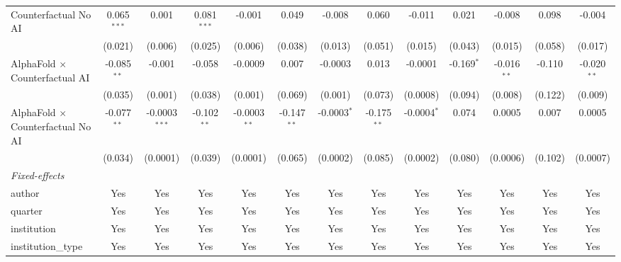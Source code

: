 \begin{tabular}{lcccccccccccc}
   Counterfactual No AI                     & 0.065$^{***}$ & 0.001           & 0.081$^{***}$ & -0.001         & 0.049         & -0.008        & 0.060         & -0.011        & 0.021         & -0.008        & 0.098        & -0.004\\   
                                            & (0.021)       & (0.006)         & (0.025)       & (0.006)        & (0.038)       & (0.013)       & (0.051)       & (0.015)       & (0.043)       & (0.015)       & (0.058)      & (0.017)\\   
   AlphaFold $\times$ Counterfactual AI     & -0.085$^{**}$ & -0.001          & -0.058        & -0.0009        & 0.007         & -0.0003       & 0.013         & -0.0001       & -0.169$^{*}$  & -0.016$^{**}$ & -0.110       & -0.020$^{**}$\\   
                                            & (0.035)       & (0.001)         & (0.038)       & (0.001)        & (0.069)       & (0.001)       & (0.073)       & (0.0008)      & (0.094)       & (0.008)       & (0.122)      & (0.009)\\   
   AlphaFold $\times$ Counterfactual No AI  & -0.077$^{**}$ & -0.0003$^{***}$ & -0.102$^{**}$ & -0.0003$^{**}$ & -0.147$^{**}$ & -0.0003$^{*}$ & -0.175$^{**}$ & -0.0004$^{*}$ & 0.074         & 0.0005        & 0.007        & 0.0005\\   
                                            & (0.034)       & (0.0001)        & (0.039)       & (0.0001)       & (0.065)       & (0.0002)      & (0.085)       & (0.0002)      & (0.080)       & (0.0006)      & (0.102)      & (0.0007)\\   
   \midrule
   \emph{Fixed-effects}\\
   author                                   & Yes           & Yes             & Yes           & Yes            & Yes           & Yes           & Yes           & Yes           & Yes           & Yes           & Yes          & Yes\\  
   quarter                                  & Yes           & Yes             & Yes           & Yes            & Yes           & Yes           & Yes           & Yes           & Yes           & Yes           & Yes          & Yes\\  
   institution                              & Yes           & Yes             & Yes           & Yes            & Yes           & Yes           & Yes           & Yes           & Yes           & Yes           & Yes          & Yes\\  
   institution\_type                        & Yes           & Yes             & Yes           & Yes            & Yes           & Yes           & Yes           & Yes           & Yes           & Yes           & Yes          & Yes\\  

\end{tabular}
